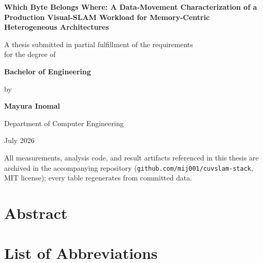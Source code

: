 \documentclass[12pt,a4paper,oneside]{report}
\newcommand{\code}[1]{\texttt{#1}}
\newcommand{\thesistitle}{Which Byte Belongs Where: A Data-Movement
Characterization of a Production Visual-SLAM Workload for Memory-Centric
Heterogeneous Architectures}
\newcommand{\thesisauthor}{Mayura Inomal}   %
\newcommand{\thesisdegree}{Bachelor of Engineering} %
\newcommand{\thesisdept}{Department of Computer Engineering} %
\newcommand{\thesisuniv}{[University Name]} %
\newcommand{\thesisdate}{July 2026}
\begin{document}

\begin{titlepage}
\centering
\vspace*{1.5cm}
{\LARGE\bfseries \thesistitle\par}
\vspace{2cm}
{\large A thesis submitted in partial fulfillment of the requirements\\
for the degree of\par}
\vspace{0.4cm}
{\large\bfseries \thesisdegree\par}
\vspace{2cm}
{\large by\par}
\vspace{0.3cm}
{\Large\bfseries \thesisauthor\par}
\vspace{2cm}
{\large \thesisdept\\ \thesisuniv\par}
\vspace{1.2cm}
{\large \thesisdate\par}
\vfill
{\small All measurements, analysis code, and result artifacts referenced in
this thesis are archived in the accompanying repository
(\code{github.com/mij001/cuvslam-stack}, MIT license); every table
regenerates from committed data.\par}
\end{titlepage}

\chapter*{Abstract}


\tableofcontents
\listoftables
{}

\chapter*{List of Abbreviations}

\end{document}
